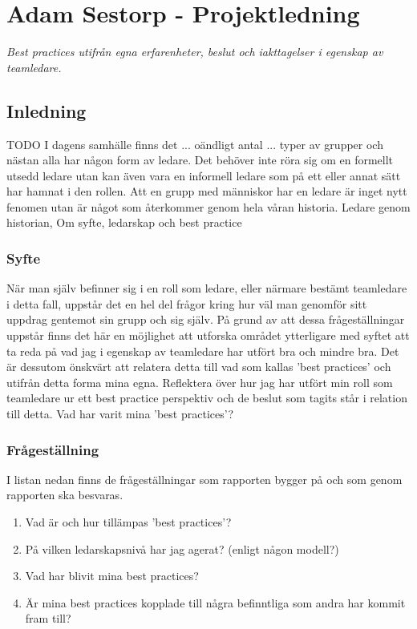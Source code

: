 \section{Adam Sestorp - Projektledning}
\emph{Best practices utifrån egna erfarenheter, beslut och iakttagelser i egenskap av teamledare.}

\subsection{Inledning}
TODO
I dagens samhälle finns det ... oändligt antal ... typer av grupper och nästan alla har någon form av ledare. Det behöver inte röra sig om en formellt utsedd ledare utan kan även vara en informell ledare som på ett eller annat sätt har hamnat i den rollen. Att en grupp med människor har en ledare är inget nytt fenomen utan är något som återkommer genom hela våran historia. 
\newline \newline
Ledare genom historian, Om syfte, ledarskap och best practice

\subsubsection{Syfte}
När man själv befinner sig i en roll som ledare, eller närmare bestämt teamledare i detta fall, uppstår det en hel del frågor kring hur väl man genomför sitt uppdrag gentemot sin grupp och sig själv. På grund av att dessa frågeställningar uppstår finns det här en möjlighet att utforska området ytterligare med syftet att ta reda på vad jag i egenskap av teamledare har utfört bra och mindre bra. Det är dessutom önskvärt att relatera detta till vad som kallas 'best practices' och utifrån detta forma mina egna.
\newline \newline
Reflektera över hur jag har utfört min roll som teamledare ur ett best practice perspektiv och de beslut som tagits står i relation till detta. Vad har varit mina 'best practices'?

\subsubsection{Frågeställning}
I listan nedan finns de frågeställningar som rapporten bygger på och som genom rapporten ska besvaras.
	\begin{enumerate}
		\item Vad är och hur tillämpas 'best practices'?
		\item På vilken ledarskapsnivå har jag agerat? (enligt någon modell?)
		\item Vad har blivit mina best practices?
		\item Är mina best practices kopplade till några befinntliga som andra har kommit fram till?
	\end{enumerate}
	
